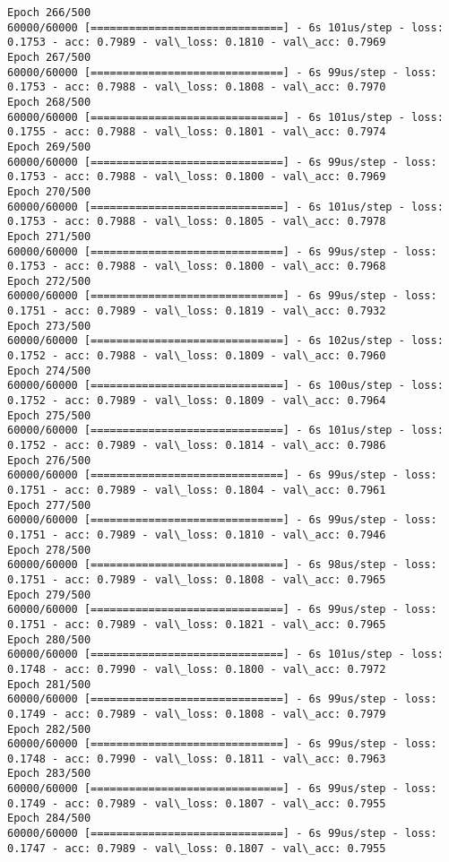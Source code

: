 \documentclass[11pt]{article}
\begin{document}
\begin{Verbatim}[commandchars=\\\{\}]
Epoch 266/500
60000/60000 [==============================] - 6s 101us/step - loss: 0.1753 - acc: 0.7989 - val\_loss: 0.1810 - val\_acc: 0.7969
Epoch 267/500
60000/60000 [==============================] - 6s 99us/step - loss: 0.1753 - acc: 0.7988 - val\_loss: 0.1808 - val\_acc: 0.7970
Epoch 268/500
60000/60000 [==============================] - 6s 101us/step - loss: 0.1755 - acc: 0.7988 - val\_loss: 0.1801 - val\_acc: 0.7974
Epoch 269/500
60000/60000 [==============================] - 6s 99us/step - loss: 0.1753 - acc: 0.7988 - val\_loss: 0.1800 - val\_acc: 0.7969
Epoch 270/500
60000/60000 [==============================] - 6s 101us/step - loss: 0.1753 - acc: 0.7988 - val\_loss: 0.1805 - val\_acc: 0.7978
Epoch 271/500
60000/60000 [==============================] - 6s 99us/step - loss: 0.1753 - acc: 0.7988 - val\_loss: 0.1800 - val\_acc: 0.7968
Epoch 272/500
60000/60000 [==============================] - 6s 99us/step - loss: 0.1751 - acc: 0.7989 - val\_loss: 0.1819 - val\_acc: 0.7932
Epoch 273/500
60000/60000 [==============================] - 6s 102us/step - loss: 0.1752 - acc: 0.7988 - val\_loss: 0.1809 - val\_acc: 0.7960
Epoch 274/500
60000/60000 [==============================] - 6s 100us/step - loss: 0.1752 - acc: 0.7989 - val\_loss: 0.1809 - val\_acc: 0.7964
Epoch 275/500
60000/60000 [==============================] - 6s 101us/step - loss: 0.1752 - acc: 0.7989 - val\_loss: 0.1814 - val\_acc: 0.7986
Epoch 276/500
60000/60000 [==============================] - 6s 99us/step - loss: 0.1751 - acc: 0.7989 - val\_loss: 0.1804 - val\_acc: 0.7961
Epoch 277/500
60000/60000 [==============================] - 6s 99us/step - loss: 0.1751 - acc: 0.7989 - val\_loss: 0.1810 - val\_acc: 0.7946
Epoch 278/500
60000/60000 [==============================] - 6s 98us/step - loss: 0.1751 - acc: 0.7989 - val\_loss: 0.1808 - val\_acc: 0.7965
Epoch 279/500
60000/60000 [==============================] - 6s 99us/step - loss: 0.1751 - acc: 0.7989 - val\_loss: 0.1821 - val\_acc: 0.7965
Epoch 280/500
60000/60000 [==============================] - 6s 101us/step - loss: 0.1748 - acc: 0.7990 - val\_loss: 0.1800 - val\_acc: 0.7972
Epoch 281/500
60000/60000 [==============================] - 6s 99us/step - loss: 0.1749 - acc: 0.7989 - val\_loss: 0.1808 - val\_acc: 0.7979
Epoch 282/500
60000/60000 [==============================] - 6s 99us/step - loss: 0.1748 - acc: 0.7990 - val\_loss: 0.1811 - val\_acc: 0.7963
Epoch 283/500
60000/60000 [==============================] - 6s 99us/step - loss: 0.1749 - acc: 0.7989 - val\_loss: 0.1807 - val\_acc: 0.7955
Epoch 284/500
60000/60000 [==============================] - 6s 99us/step - loss: 0.1747 - acc: 0.7989 - val\_loss: 0.1807 - val\_acc: 0.7955

\end{Verbatim}
\end{document}
